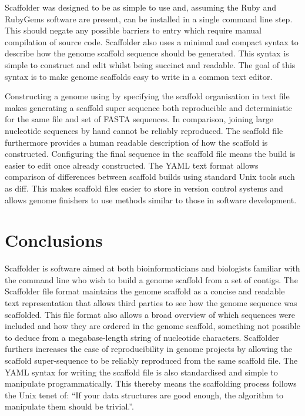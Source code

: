 \documentclass[10pt]{bmc_article}
\newenvironment{bmcformat}{\begin{raggedright}\baselineskip20pt\sloppy\setboolean{publ}{false}}{\end{raggedright}\baselineskip20pt\sloppy}
\begin{document}
\begin{bmcformat}
Scaffolder was designed to be as simple to use and, assuming the Ruby and
RubyGems software are present, can be installed in a single command line step.
This should negate any possible barriers to entry which require manual
compilation of source code. Scaffolder also uses a minimal and compact syntax
to describe how the genome scaffold sequence should be generated. This syntax
is simple to construct and edit whilst being succinct and readable. The goal
of this syntax is to make genome scaffolds easy to write in a common text
editor. \pb

Constructing a genome using by specifying the scaffold organisation in text
file makes generating a scaffold super sequence both reproducible and
deterministic for the same file and set of FASTA sequences. In comparison,
joining large nucleotide sequences by hand cannot be reliably reproduced. The
scaffold file furthermore provides a human readable description of how the
scaffold is constructed. Configuring the final sequence in the scaffold file
means the build is easier to edit once already constructed. The YAML text
format allows comparison of differences between scaffold builds using standard
Unix tools such as diff. This makes scaffold files easier to store in version
control systems and allows genome finishers to use methods similar to those in
software development. \pb 

\clearpage

\section*{Conclusions} %

Scaffolder is software aimed at both bioinformaticians and biologists familiar
with the command line who wish to build a genome scaffold from a set of
contigs. The Scaffolder file format maintains the genome scaffold as a concise
and readable text representation that allows third parties to see how the
genome sequence was scaffolded. This file format also allows a broad overview
of which sequences were included and how they are ordered in the genome
scaffold, something not possible to deduce from a megabase-length string of
nucleotide characters. Scaffolder furthers increases the ease of
reproducibility in genome projects by allowing the scaffold super-sequence to
be reliably reproduced from the same scaffold file. The YAML syntax for
writing the scaffold file is also standardised and simple to manipulate
programmatically. This thereby means the scaffolding process follows the Unix
tenet of: ``If your data structures are good enough, the algorithm to
manipulate them should be trivial.''.


\end{bmcformat}
\end{document}
